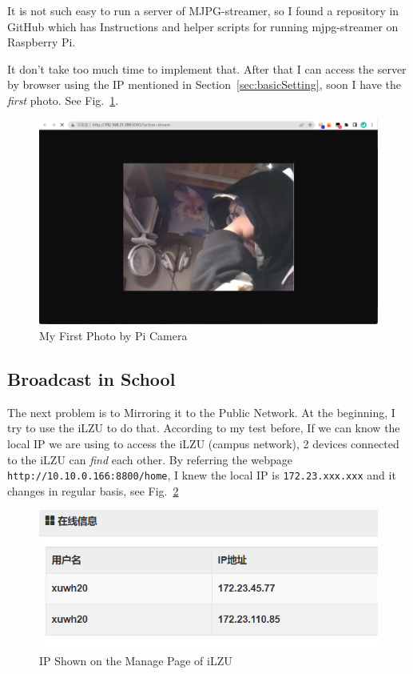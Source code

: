 \documentclass{article}
\begin{document}
It is not such easy to run a server of MJPG-streamer, so I found a repository in GitHub which has Instructions and helper scripts for running mjpg-streamer on Raspberry Pi\cite{gh:rpi-mjpg-streamer}.

It don't take too much time to implement that. After that I can access the server by browser using the IP mentioned in Section~\ref{sec:basicSetting}, soon I have the \emph{first} photo. See Fig.~\ref{fig:FirstPicOfPicam}.

\begin{figure}[!h]
	\centering
	\includegraphics[width=5 in]{../pic/FirstPicOfPicam.png}
	\caption{My First Photo by Pi Camera}
	\label{fig:FirstPicOfPicam}
\end{figure}

\subsection{Broadcast in School}

The next problem is to Mirroring it to the Public Network. At the beginning, I try to use the iLZU to do that. According to my test before, If we can know the local IP we are using to access the iLZU (campus network), 2 devices connected to the iLZU can \emph{find} each other. By referring the webpage \verb|http://10.10.0.166:8800/home|, I knew the local IP is \verb|172.23.xxx.xxx| and it changes in regular basis, see Fig.~\ref{fig:iLZU-IP}

\newpage

\begin{figure}[!h]
	\centering
	\includegraphics[width=3 in]{../pic/iLZU-IP.png}
	\caption{IP Shown on the Manage Page of iLZU}
	\label{fig:iLZU-IP}
\end{figure}
\end{document}
